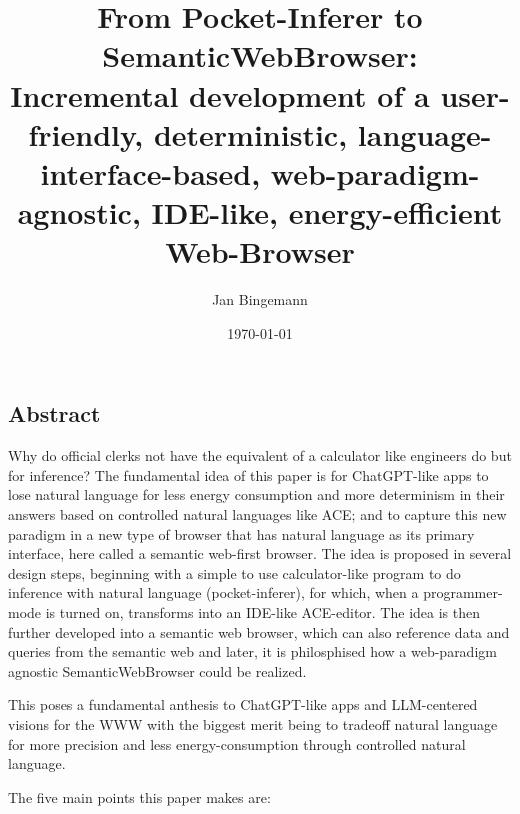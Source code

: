 \documentclass[12pt,a4paper]{article}
\title{From Pocket-Inferer to SemanticWebBrowser:\\Incremental development of a user-friendly, deterministic, language-interface-based, web-paradigm-agnostic, IDE-like, energy-efficient Web-Browser}
\author{Jan Bingemann}
\date{\today}
\begin{document}
\maketitle

\newpage
\tableofcontents
\newpage

\subsection*{Abstract}

Why do official clerks not have the equivalent of a calculator like engineers do but for inference?
The fundamental idea of this paper is for ChatGPT-like apps to lose natural language for less energy consumption and more determinism in their answers based on controlled natural languages like ACE; and to capture this new paradigm in a new type of browser that has natural language as its primary interface, here called a semantic web-first browser.
The idea is proposed in several design steps, beginning with a simple to use calculator-like program to do inference with natural language (pocket-inferer), for which, when a programmer-mode is turned on, transforms into an IDE-like ACE-editor.
The idea is then further developed into a semantic web browser, which can also reference data and queries from the semantic web and later, it is philosphised how a web-paradigm agnostic SemanticWebBrowser could be realized.

This poses a fundamental anthesis to ChatGPT-like apps and LLM-centered visions for the WWW with the biggest merit being to tradeoff natural language for more precision and less energy-consumption through controlled natural language.


The five main points this paper makes are:
\end{document}
